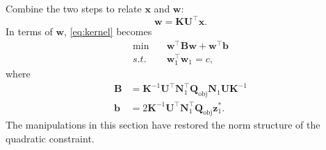 \documentclass[journal,twoside]{IEEEtran}
\renewcommand{\vec}[1]{\mathbf{#1}}
\begin{document}
Combine the two steps to relate $\vec{x}$ and $\vec{w}$:
\begin{equation}
\vec{w} = \mathbf{KU}^\top \vec{x}.
\end{equation}
In terms of $\vec{w}$, \eqref{eq:kernel} becomes
\begin{subequations}\label{eq:diagonal}
\begin{align}
\label{eq:diagonal-obj} \min\quad &\vec{w}^\top \mathbf{B}\vec{w} + \vec{w}^\top \vec{b} \\
\label{eq:diagonal-quad} s.t.\quad &\vec{w}_1^\top \vec{w}_1 = c,
\end{align}
\end{subequations}
where
\begin{align*}
\mathbf{B} &= \mathbf{K}^{-1}\mathbf{U}^\top \mathbf{N}_1^\top \mathbf{Q}_\text{obj} \mathbf{N}_1 \mathbf{U}\mathbf{K}^{-1} \\
\vec{b} &= 2 \mathbf{K}^{-1}\mathbf{U}^\top
\mathbf{N}_1^\top \mathbf{Q}_\text{obj} \vec{z}_1^*.
\end{align*}
The manipulations in this section have restored the norm structure of the quadratic constraint.
\end{document}
